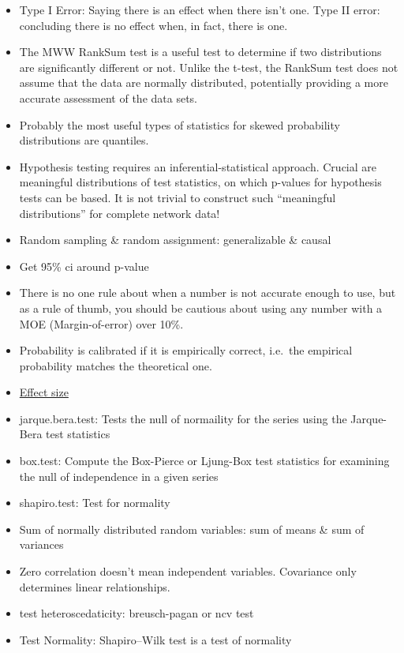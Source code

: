 \documentclass[]{book}
\begin{document}
\begin{itemize}
\item
  Type I Error: Saying there is an effect when there isn't one. Type II
  error: concluding there is no effect when, in fact, there is one.
\item
  The MWW RankSum test is a useful test to determine if two
  distributions are significantly different or not. Unlike the t-test,
  the RankSum test does not assume that the data are normally
  distributed, potentially providing a more accurate assessment of the
  data sets.
\item
  Probably the most useful types of statistics for skewed probability
  distributions are quantiles.
\item
  Hypothesis testing requires an inferential-statistical approach.
  Crucial are meaningful distributions of test statistics, on which
  p-values for hypothesis tests can be based. It is not trivial to
  construct such ``meaningful distributions'' for complete network data!
\item
  Random sampling \& random assignment: generalizable \& causal
\item
  Get 95\% ci around p-value
\item
  There is no one rule about when a number is not accurate enough to
  use, but as a rule of thumb, you should be cautious about using any
  number with a MOE (Margin-of-error) over 10\%.
\item
  Probability is calibrated if it is empirically correct, i.e.~the
  empirical probability matches the theoretical one.
\item
  \href{https://artax.karlin.mff.cuni.cz/r-help/library/lsr/html/cohensD.html}{Effect
  size}
\item
  jarque.bera.test: Tests the null of normaility for the series using
  the Jarque-Bera test statistics
\item
  box.test: Compute the Box-Pierce or Ljung-Box test statistics for
  examining the null of independence in a given series
\item
  shapiro.test: Test for normality
\item
  Sum of normally distributed random variables: sum of means \& sum of
  variances
\item
  Zero correlation doesn't mean independent variables. Covariance only
  determines linear relationships.
\item
  test heteroscedaticity: breusch-pagan or ncv test
\item
  Test Normality: Shapiro--Wilk test is a test of normality

\end{itemize}
\end{document}
